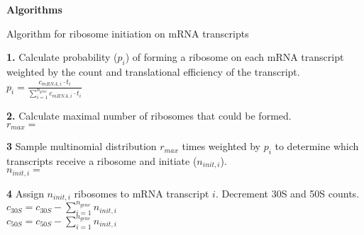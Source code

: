 \documentclass[12pt]{article}
\begin{document}
\textbf{Algorithms}

\begin{algorithm}[H]
\caption{Algorithm for ribosome initiation on mRNA transcripts}
\label{polypeptide_initiation_algorithm}


  \textbf{1.} Calculate probability ($p_i$) of forming a ribosome on each mRNA transcript weighted by the count and translational efficiency of the transcript.\\
    \-\hspace{1cm} $p_i = \frac{c_{mRNA,i} \cdot t_i}{\sum\limits^{n_{gene}}_{i=1} c_{mRNA,i} \cdot t_i}$

    \textbf{2.} Calculate maximal number of ribosomes that could be formed.\\
    \-\hspace{1cm} $r_{max} =$ 

    \textbf{3} Sample multinomial distribution $r_{max}$ times weighted by $p_i$ to determine which transcripts receive a ribosome and initiate ($n_{init,i}$).\\
    \-\hspace{1cm} $n_{init,i} =$ 

    \textbf{4} Assign $n_{init,i}$ ribosomes to mRNA transcript $i$. Decrement 30S and 50S counts.\\
    \-\hspace{1cm} $c_{30S} = c_{30S} - \sum\limits^{n_{gene}}_{i=1} n_{init,i}$\\
    \-\hspace{1cm} $c_{50S} = c_{50S} - \sum\limits^{n_{gene}}_{i=1} n_{init,i}$\\

\end{algorithm}
\newpage
\end{document}
